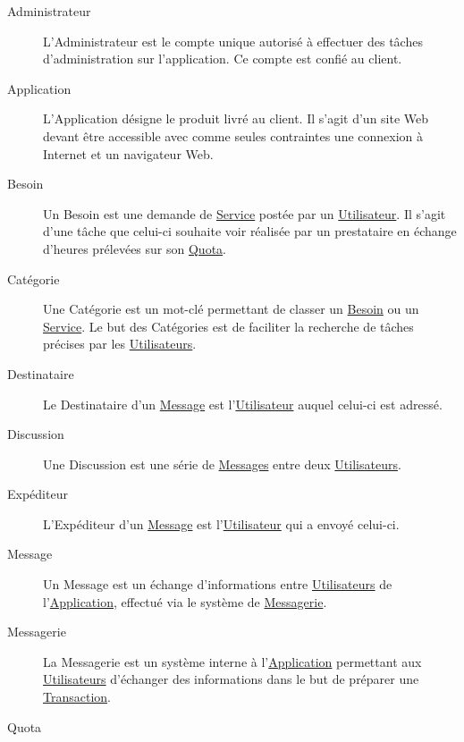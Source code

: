 \documentclass[french]{article}
\begin{document}
		\begin{description}
			\item[\hypertarget{administrateur}{Administrateur}] 
				L’Administrateur est le compte unique autorisé à effectuer des tâches
				 d’administration sur l’application. Ce compte est confié au client.
			\item[\hypertarget{application}{Application}]
				L’Application désigne le produit livré au client. Il s’agit d’un site
				 Web devant être accessible avec comme seules contraintes une connexion
				 à Internet et un navigateur Web.
			\item[\hypertarget{besoin}{Besoin}]
				Un Besoin est une demande de \hyperlink{service}{Service} postée par un
				 \hyperlink{utilisateur}{Utilisateur}. Il s’agit d’une tâche que
				 celui-ci souhaite voir réalisée par un prestataire en échange d’heures
				 prélevées sur son \hyperlink{quota}{Quota}.
			\item[\hypertarget{categorie}{Catégorie}]
				Une Catégorie est un mot-clé permettant de classer un
				 \hyperlink{besoin}{Besoin} ou un \hyperlink{service}{Service}. Le but
				 des Catégories est de faciliter la recherche de tâches précises par les
				 \hyperlink{utilisateur}{Utilisateurs}.
			\item[\hypertarget{destinataire}{Destinataire}]
				Le Destinataire d’un \hyperlink{message}{Message} est
				 l’\hyperlink{utilisateur}{Utilisateur} auquel celui-ci est adressé.
			\item[\hypertarget{discussion}{Discussion}]
				Une Discussion est une série de \hyperlink{message}{Messages} entre deux
				 \hyperlink{utilisateur}{Utilisateurs}.
			\item[\hypertarget{expediteur}{Expéditeur}]
				L’Expéditeur d’un \hyperlink{message}{Message} est
				 l’\hyperlink{utilisateur}{Utilisateur} qui a envoyé celui-ci.
			\item[\hypertarget{message}{Message}]
				Un Message est un échange d’informations entre
				 \hyperlink{utilisateur}{Utilisateurs} de
				 l’\hyperlink{application}{Application}, effectué via le système de
				 \hyperlink{messagerie}{Messagerie}.
			\item[\hypertarget{messagerie}{Messagerie}]
				La Messagerie est un système interne à
				 l’\hyperlink{application}{Application} permettant aux
				 \hyperlink{utilisateur}{Utilisateurs} d’échanger des informations dans
				 le but de préparer une \hyperlink{transaction}{Transaction}.
			\item[\hypertarget{quota}{Quota}]

\end{description}
\end{document}

